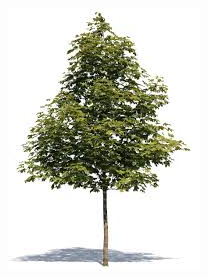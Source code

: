 \documentclass[aspectratio=43]{beamer}
\begin{document}
\begin{frame}
\begin{figure}
		\endminipage\hfill
		\includegraphics[width = \linewidth]{plots/tree3.jpeg}
		\endminipage
	\end{figure}

\end{frame}
\end{document}
